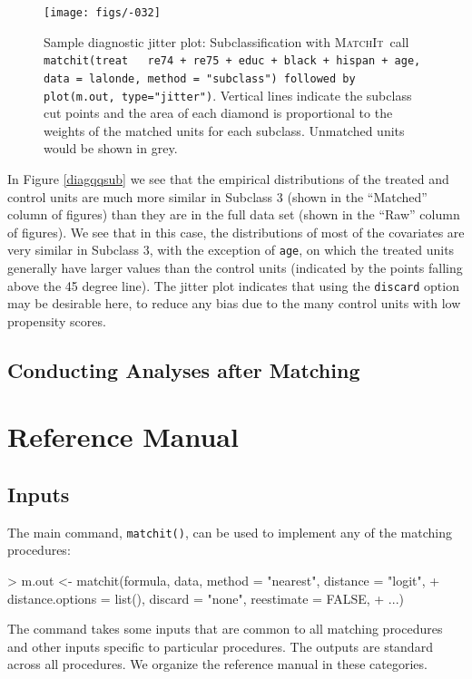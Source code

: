 \documentclass[oneside,letterpaper,titlepage]{article}
\newcommand{\MatchIt}{\textsc{MatchIt}}
\begin{document}
\begin{figure}[tbp]
  \begin{center}
\texttt{[image: figs/-032]}
    \hfill
    \caption{Sample diagnostic jitter plot: Subclassification with
      \MatchIt\ call \texttt{matchit(treat ~ re74 + re75 + educ +
        black + hispan + age, data = lalonde, method = "subclass")
        followed by plot(m.out, type="jitter")}.  Vertical lines
      indicate the subclass cut points and the area of each diamond is
      proportional to the weights of the matched units for each
      subclass.  Unmatched units would be shown in grey.}
    \label{diagjittersub}
  \end{center}
\end{figure}

In Figure \ref{diagqqsub} we see that the empirical distributions of
the treated and control units are much more similar in Subclass 3
(shown in the ``Matched'' column of figures) than they are in the full
data set (shown in the ``Raw'' column of figures).  We see that in
this case, the distributions of most of the covariates are very
similar in Subclass 3, with the exception of \texttt{age}, on
which the treated units generally have larger values than the control
units (indicated by the points falling above the 45 degree line).  The
jitter plot indicates that using the \texttt{discard} option may be
desirable here, to reduce any bias due to the many control units with
low propensity scores.


\subsection{Conducting Analyses after Matching}
\label{subsec:analysis}




\section{Reference Manual}
\label{sec:reference}

\subsection{Inputs}
\label{subsec:inputs}

The main command, \texttt{matchit()}, can be used to implement any of
the matching procedures:
\begin{Schunk}
\begin{Sinput}
> m.out <- matchit(formula, data, method = "nearest", distance = "logit", 
+     distance.options = list(), discard = "none", reestimate = FALSE, 
+     ...)
\end{Sinput}
\end{Schunk}
The command takes some inputs that are common to all matching
procedures and other inputs specific to particular procedures.  The
outputs are standard across all procedures.  We organize the reference
manual in these categories.
\end{document}
